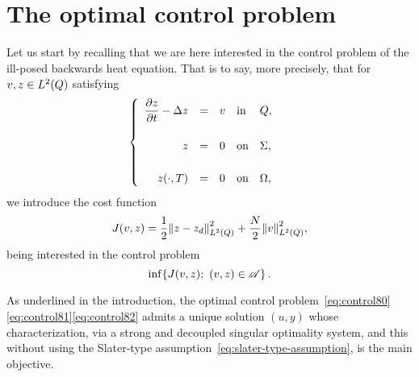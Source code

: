\section{The optimal control problem}\label{sec:controlproblem}

Let us start by recalling that we are here interested in the control
problem of the ill-posed backwards heat equation. That is to say, more
precisely, that for $v,z\in L^{2}\!\left({Q}\right)$ satisfying
\begin{equation}\label{eq:control80}
    \begin{cases}\displaystyle
        \begin{array}{rclll}
            \dfrac{\partial{}z}{\partial{}t} - \Delta z & = & v & \text{in} & Q,\\
            \\
            z & = & 0 & \text{on} & \Sigma,\\
            \\
            {z}\!\left({\cdot,T}\right) & = & 0 & \text{on} & \Omega,
        \end{array}
    \end{cases}
\end{equation}
we introduce the cost function
\begin{equation}\label{eq:control81}
    J(v,z) = \dfrac{1}{2}{\left\|{z - z_{d} }\right\|}_{L^{2}\left({Q}\right)}^{2} + \dfrac{N}{2}{\left\|{v }\right\|}_{L^{2}\left({Q}\right)}^{2},
\end{equation}
being interested in the control problem
\begin{equation}\label{eq:control82}
    \inf\!\left\{{%
        J(v,z);\ (v,z)\in\Ascr
    }\right\}.
\end{equation}

As underlined in the introduction, the optimal control
problem~\eqref{eq:control80}\eqref{eq:control81}\eqref{eq:control82} admits
a unique solution $(u,y)$ whose characterization, via a strong and
decoupled singular optimality system, and this without using the
Slater-type assumption~\eqref{eq:slater-type-assumption}, is the main
objective.

